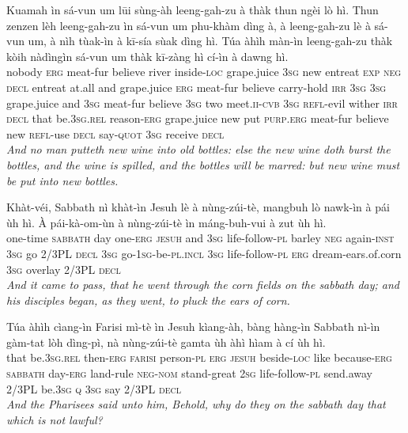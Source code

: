 \documentclass[11pt,a4paper]{article}
\begin{document}
\begin{exe}
\gll Kuamah ìn sá-vun um lūi sùng-àh leeng-gah-zu à thàk thun ngèi lò hì. Thun zenzen lèh leeng-gah-zu ìn sá-vun um phu-khàm dìng à, à leeng-gah-zu lè à sá-vun um, à nìh tùak-ìn à kī-sía sùak dìng hì. Túa àhìh màn-ìn leeng-gah-zu thàk kòih nàdìngìn sá-vun um thàk kī-zàng hì cí-ìn à dawng hì. \\
     nobody \textsc{erg} meat-fur believe river inside-\textsc{loc} grape.juice \textsc{3sg} new entreat \textsc{exp} \textsc{neg} \textsc{decl} entreat at.all and grape.juice \textsc{erg} meat-fur believe carry-hold \textsc{irr} \textsc{3sg} \textsc{3sg} grape.juice and \textsc{3sg} meat-fur believe \textsc{3sg} two meet.\textsc{ii}-\textsc{cvb} \textsc{3sg} \textsc{refl}-evil wither \textsc{irr} \textsc{decl} that be.\textsc{3sg}.\textsc{rel} reason-\textsc{erg} grape.juice new put \textsc{purp}.\textsc{erg} meat-fur believe new \textsc{refl}-use \textsc{decl} say-\textsc{quot} \textsc{3sg} receive \textsc{decl} \\
\glt \textcolor{kjvcolor}{\textit{And no man putteth new wine into old bottles: else the new wine doth burst the bottles, and the wine is spilled, and the bottles will be marred: but new wine must be put into new bottles.}}

\gll Khàt-véi, Sabbath nì khàt-ìn Jesuh lè à nùng-zúi-tè, mangbuh lò nawk-ìn à pái ùh hì. À pái-kà-om-ùn à nùng-zúi-tè ìn máng-buh-vui à zut ùh hì. \\
     one-time \textsc{sabbath} day one-\textsc{erg} \textsc{jesuh} and \textsc{3sg} life-follow-\textsc{pl} barley \textsc{neg} again-\textsc{inst} \textsc{3sg} go 2/3PL \textsc{decl} \textsc{3sg} go-\textsc{1sg}-be-\textsc{pl}.\textsc{incl} \textsc{3sg} life-follow-\textsc{pl} \textsc{erg} dream-ears.of.corn \textsc{3sg} overlay 2/3PL \textsc{decl} \\
\glt \textcolor{kjvcolor}{\textit{And it came to pass, that he went through the corn fields on the sabbath day; and his disciples began, as they went, to pluck the ears of corn.}}

\gll Túa àhìh cìang-ìn Farisi mì-tè ìn Jesuh kìang-àh, bàng hàng-ìn Sabbath nì-ìn gàm-tat lòh dìng-pì, nà nùng-zúi-tè gamta ùh àhì hìam à cí ùh hì. \\
     that be.\textsc{3sg}.\textsc{rel} then-\textsc{erg} \textsc{farisi} person-\textsc{pl} \textsc{erg} \textsc{jesuh} beside-\textsc{loc} like because-\textsc{erg} \textsc{sabbath} day-\textsc{erg} land-rule \textsc{neg}-\textsc{nom} stand-great \textsc{2sg} life-follow-\textsc{pl} send.away 2/3PL be.\textsc{3sg} \textsc{q} \textsc{3sg} say 2/3PL \textsc{decl} \\
\glt \textcolor{kjvcolor}{\textit{And the Pharisees said unto him, Behold, why do they on the sabbath day that which is not lawful?}}


\end{exe}
\end{document}
